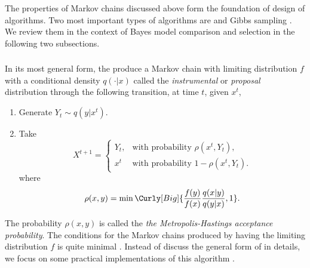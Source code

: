 The properties of Markov chains discussed above form the foundation of design
of \mcmc algorithms. Two most important types of \mcmc algorithms are \mha
\parencite{Hastings1970,Metropolis1953} and Gibbs sampling
\parencite{Geman1993}. We review them in the context of Bayes model comparison
and selection in the following two subsections.

\subsubsection{\mha}
\label{ssub:mha}

In its most general form, the \mha produce a Markov chain with limiting
distribution $f$ with a conditional density $q(\cdot|x)$ called the
\emph{instrumental} or \emph{proposal} distribution through the following
transition, at time $t$, given $x^t$,
\begin{enumerate}
  \item Generate $Y_t \sim q(y|x^t)$.
  \item Take
    \[
      X^{t+1} = \begin{cases}
        Y_t, &\text{with probability } \rho(x^t,Y_t),\\
        x^t  &\text{with probability } 1 - \rho(x^t,Y_t).
      \end{cases}
    \]
    where
    \begin{equation}
      \rho(x,y) = \min\Curly[Big]{\frac{f(y)}{f(x)}\frac{q(x|y)}{q(y|x)},1}.
    \end{equation}
\end{enumerate}
The probability $\rho(x,y)$ is called the \emph{the Metropolis-Hastings
  acceptance probability}. The conditions for the Markov chains produced by
\mha having the limiting distribution $f$ is quite minimal
\parencite[see][chap.~7]{Robert2004}. Instead of discuss the general form of
\mha in details, we focus on some practical implementations of this algorithm
\parencite[also see][for the speed of convergence of the \mha]{Mengersen1996}.


